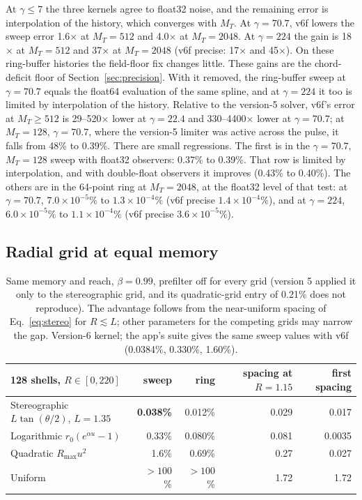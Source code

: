 \documentclass[11pt, a4paper]{article}
\begin{document}
At $\gamma \le 7$ the three kernels agree to float32 noise, and the remaining error is interpolation of the history, which converges with $M_T$. At $\gamma = 70.7$, v6f lowers the sweep error 1.6$\times$ at $M_T = 512$ and 4.0$\times$ at $M_T = 2048$. At $\gamma = 224$ the gain is 18$\times$ at $M_T = 512$ and 37$\times$ at $M_T = 2048$ (v6f precise: 17$\times$ and 45$\times$). On these ring-buffer histories the field-floor fix changes little. These gains are the chord-deficit floor of Section~\ref{sec:precision}. With it removed, the ring-buffer sweep at $\gamma = 70.7$ equals the float64 evaluation of the same spline, and at $\gamma = 224$ it too is limited by interpolation of the history. Relative to the version-5 solver, v6f's error at $M_T \ge 512$ is 29--520$\times$ lower at $\gamma = 22.4$ and 330--4400$\times$ lower at $\gamma = 70.7$; at $M_T = 128$, $\gamma = 70.7$, where the version-5 limiter was active across the pulse, it falls from 48\% to 0.39\%. There are small regressions. The first is in the $\gamma = 70.7$, $M_T = 128$ sweep with float32 observers: 0.37\% to 0.39\%. That row is limited by interpolation, and with double-float observers it improves (0.43\% to 0.40\%). The others are in the 64-point ring at $M_T = 2048$, at the float32 level of that test: at $\gamma = 70.7$, $7.0\times10^{-5}\%$ to $1.3\times10^{-4}\%$ (v6f precise $1.4\times10^{-4}\%$), and at $\gamma = 224$, $6.0\times10^{-5}\%$ to $1.1\times10^{-4}\%$ (v6f precise $3.6\times10^{-5}\%$).

\subsection{Radial grid at equal memory}
\begin{table}[htbp]
\centering
\begin{tabular}{@{}lrrrr@{}}
\toprule
128 shells, $R \in [0, 220]$ & sweep & ring & spacing at $R = 1.15$ & first spacing \\
\midrule
Stereographic $L\tan(\theta/2)$, $L = 1.35$ & \textbf{0.038\%} & 0.012\% & 0.029 & 0.017 \\
Logarithmic $r_0(e^{\alpha u} - 1)$         & 0.33\%  & 0.080\% & 0.081 & 0.0035 \\
Quadratic $R_{\max} u^2$                    & 1.6\%   & 0.69\%  & 0.27  & 0.027 \\
Uniform                                     & $>100$\% & $>100$\% & 1.72 & 1.72 \\
\bottomrule
\end{tabular}
\caption{Same memory and reach, $\beta = 0.99$, prefilter off for every grid (version 5 applied it only to the stereographic grid, and its quadratic-grid entry of 0.21\% does not reproduce). The advantage follows from the near-uniform spacing of Eq.~\eqref{eq:stereo} for $R \lesssim L$; other parameters for the competing grids may narrow the gap. Version-6 kernel; the app's suite gives the same sweep values with v6f (0.0384\%, 0.330\%, 1.60\%).}
\label{tab:grids}
\end{table}
\end{document}
